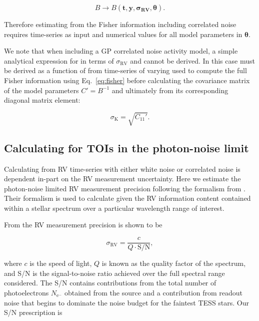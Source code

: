 \begin{equation}
  B \to B(\mathbf{t}, \mathbf{y}, \boldsymbol{\sigma_{\text{RV}}}, \boldsymbol{\theta}).
\end{equation}

\noindent Therefore estimating \sigK{} from the Fisher
information including correlated noise requires time-series as input and numerical values for all model
parameters in $\boldsymbol{\theta}$.

We note that when including a GP correlated noise activity model, a simple analytical expression
for \sigK{} in terms of $\sigma_{\text{RV}}$ and \nrv{} cannot be derived. In this case \sigK{} must be
derived as a function of \nrv{}
from time-series of varying \nrv{} used to compute the full Fisher
information using Eq.~\ref{eq:fisher} before calculating the covariance matrix of the model parameters
$C'=B^{-1}$ and ultimately \sigK{} from its corresponding diagonal matrix element:

\begin{equation}
  \sigma_{\text{K}} = \sqrt{C_{11}'}.
  \label{eq:sigKGP}
\end{equation}

\subsection{Calculating \sigRV{} for TOIs in the photon-noise limit} \label{sect:sigrv}
Calculating \sigK{} from RV time-series with either white noise or correlated noise is dependent
in-part on the RV measurement uncertainty. Here we estimate the photon-noise limited
RV measurement precision \sigRV{} following the formalism from \cite{bouchy01}. Their formalism
is used to calculate \sigRV{} given the RV information content contained within a stellar spectrum
over a particular wavelength range of interest.

From \cite{bouchy01} the RV measurement precision \sigRV{} is shown to be

\begin{equation}
  \sigma_{\text{RV}} = \frac{c}{Q \cdot \text{S/N}},
  \label{eq:sigrv}
\end{equation}

\noindent where $c$ is the speed of light, $Q$ is known as the quality factor of the spectrum,
and S/N is the signal-to-noise ratio achieved over the full spectral range considered. The
S/N contains contributions from the total number of photoelectrons $N_{\text{e}^-}$ obtained from
the source and a contribution from readout noise that begins to dominate the noise budget for the
faintest TESS stars. Our S/N prescription is

